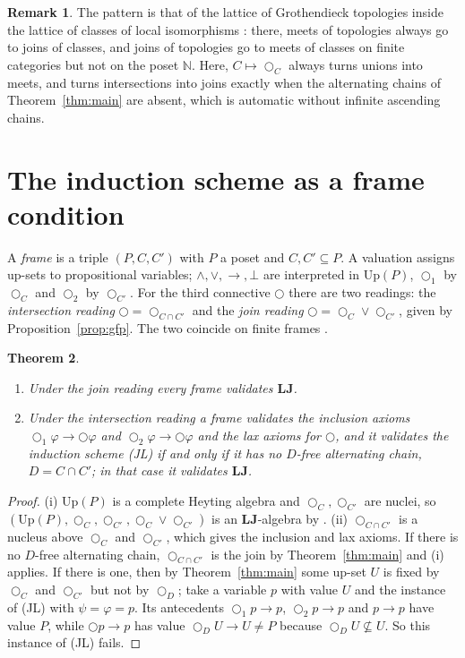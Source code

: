 \documentclass[11pt]{amsart}
\newtheorem{thm}{Theorem}[section]
\theoremstyle{definition}
\newtheorem{rem}[thm]{Remark}
\newcommand{\Up}{\mathrm{Up}}
\newcommand{\LLJ}{\mathbf{LJ}}
\newcommand{\lax}{\bigcirc}
\newcommand{\laxa}{\bigcirc_1}
\newcommand{\laxb}{\bigcirc_2}
\begin{document}
\begin{rem}
The pattern is that of the lattice of Grothendieck topologies inside the
lattice of classes of local isomorphisms \cite{Topjoin,Finitejoin}: there,
meets of topologies always go to joins of classes, and joins of topologies go
to meets of classes on finite categories but not on the poset $\mathbb N$.
Here, $C\mapsto\lax_C$ always turns unions into meets, and turns
intersections into joins exactly when the alternating chains of
Theorem~\ref{thm:main} are absent, which is automatic without infinite
ascending chains.
\end{rem}

\section{The induction scheme as a frame condition}\label{sec:frames}

A \emph{frame} is a triple $(P,C,C')$ with $P$ a poset and $C,C'\subseteq P$.
A valuation assigns up-sets to propositional variables; $\wedge,\vee,\to,\bot$
are interpreted in $\Up(P)$, $\laxa$ by $\lax_C$ and $\laxb$ by $\lax_{C'}$.
For the third connective $\lax$ there are two readings: the
\emph{intersection reading} $\lax=\lax_{C\cap C'}$ and the \emph{join
reading} $\lax=\lax_C\vee\lax_{C'}$, given by Proposition~\ref{prop:gfp}. The
two coincide on finite frames \cite[Thm.~4.1]{Laxjoin}.

\begin{thm}\label{thm:corr}
\begin{enumerate}
\item[(i)] Under the join reading every frame validates $\LLJ$.
\item[(ii)] Under the intersection reading a frame validates the inclusion
axioms $\laxa\varphi\to\lax\varphi$ and $\laxb\varphi\to\lax\varphi$ and the
lax axioms for $\lax$, and it validates the induction scheme (JL) if and only
if it has no $D$-free alternating chain, $D=C\cap C'$; in that case it
validates $\LLJ$.
\end{enumerate}
\end{thm}
\begin{proof}
(i) $\Up(P)$ is a complete Heyting algebra and $\lax_C,\lax_{C'}$ are nuclei,
so $(\Up(P),\lax_C,\lax_{C'},\lax_C\vee\lax_{C'})$ is an $\LLJ$-algebra by
\cite[Prop.~3.2]{Laxjoin}. (ii) $\lax_{C\cap C'}$ is a nucleus above
$\lax_C$ and $\lax_{C'}$, which gives the inclusion and lax axioms. If there
is no $D$-free alternating chain, $\lax_{C\cap C'}$ is the join by
Theorem~\ref{thm:main} and (i) applies. If there is one, then by
Theorem~\ref{thm:main} some up-set $U$ is fixed by $\lax_C$ and $\lax_{C'}$
but not by $\lax_D$; take a variable $p$ with value $U$ and the instance of
(JL) with $\psi=\varphi=p$. Its antecedents $\laxa p\to p$, $\laxb p\to p$ and
$p\to p$ have value $P$, while $\lax p\to p$ has value
$\lax_DU\to U\ne P$ because $\lax_DU\not\subseteq U$. So this instance of
(JL) fails.
\end{proof}
\end{document}
